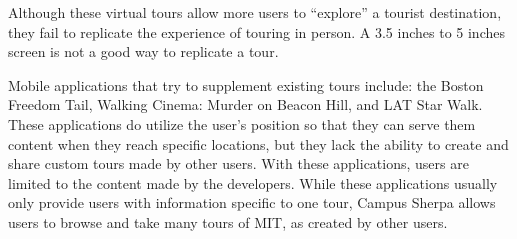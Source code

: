 \documentclass{sigchi}
\begin{document}
Although these virtual tours allow more users to ``explore'' a tourist destination, they fail to replicate the experience of touring in person. A 3.5 inches to 5 inches screen is not a good way to replicate a tour.


Mobile applications that try to supplement existing tours include: the Boston Freedom Tail, Walking Cinema: Murder on Beacon Hill, and LAT Star Walk. These applications do utilize the user's position so that they can serve them content when they reach specific locations, but they lack the ability to create and share custom tours made by other users. With these applications, users are limited to the content made by the developers. While these applications usually only provide users with information specific to one tour, Campus Sherpa allows users to browse and take many tours of MIT, as created by other users.
\end{document}
